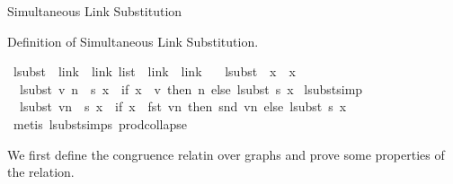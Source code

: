 \begin{isabellebody}
\begin{isamarkuptext}
Simultaneous Link Substitution%
\end{isamarkuptext}\isamarkuptrue%
%
\begin{isamarkuptext}%
Definition of Simultaneous Link Substitution.%
\end{isamarkuptext}\isamarkuptrue%
\isamarkupfalse%
\ lsubst\ {\isacharcolon}{\kern0pt}{\isacharcolon}{\kern0pt}\ {\isachardoublequoteopen}{\isacharparenleft}{\kern0pt}link\ {\isacharasterisk}{\kern0pt}\ link{\isacharparenright}{\kern0pt}\ list\ {\isacharequal}{\kern0pt}{\isachargreater}{\kern0pt}\ link\ {\isacharequal}{\kern0pt}{\isachargreater}{\kern0pt}\ link{\isachardoublequoteclose}\ \isanewline
\ \ {\isachardoublequoteopen}lsubst\ {\isacharbrackleft}{\kern0pt}{\isacharbrackright}{\kern0pt}\ x\ {\isacharequal}{\kern0pt}\ x{\isachardoublequoteclose}\ {\isacharbar}{\kern0pt}\isanewline
\ \ {\isachardoublequoteopen}lsubst\ {\isacharparenleft}{\kern0pt}{\isacharparenleft}{\kern0pt}v{\isacharcomma}{\kern0pt}\ n{\isacharparenright}{\kern0pt}\ {\isacharhash}{\kern0pt}\ s{\isacharparenright}{\kern0pt}\ x\ {\isacharequal}{\kern0pt}\ {\isacharparenleft}{\kern0pt}if\ x\ {\isacharequal}{\kern0pt}\ v\ then\ n\ else\ lsubst\ s\ x{\isacharparenright}{\kern0pt}{\isachardoublequoteclose}\isanewline
\isanewline
\isanewline
{}\isamarkupfalse%
\ lsubst{\isacharunderscore}{\kern0pt}simp{\isacharcolon}{\kern0pt}\isanewline
\ \ {\isachardoublequoteopen}lsubst\ {\isacharparenleft}{\kern0pt}vn\ {\isacharhash}{\kern0pt}\ s{\isacharparenright}{\kern0pt}\ x\ {\isacharequal}{\kern0pt}\ {\isacharparenleft}{\kern0pt}if\ x\ {\isacharequal}{\kern0pt}\ fst\ vn\ then\ snd\ vn\ else\ lsubst\ s\ x{\isacharparenright}{\kern0pt}{\isachardoublequoteclose}\isanewline
%
\isadelimproof
%
\endisadelimproof
%
\isatagproof
{}\isamarkupfalse%
\ {\isacharparenleft}{\kern0pt}metis\ lsubst{\isachardot}{\kern0pt}simps{\isacharparenleft}{\kern0pt}{}{\isacharparenright}{\kern0pt}\ prod{\isachardot}{\kern0pt}collapse{\isacharparenright}{\kern0pt}%
\endisatagproof
{\isafoldproof}%
%
\isadelimproof
%
\endisadelimproof
%
\isadelimdocument
%
\endisadelimdocument
%
\isatagdocument
%
\isamarkuptrue%
%
\endisatagdocument
{\isafolddocument}%
%
\isadelimdocument
%
\endisadelimdocument
%
\begin{isamarkuptext}%
We first define the congruence relatin over graphs
  and prove some properties of the relation.%
\end{isamarkuptext}\isamarkuptrue%
%
\begin{isamarkuptext}%

\end{isamarkuptext}
\end{isabellebody}
